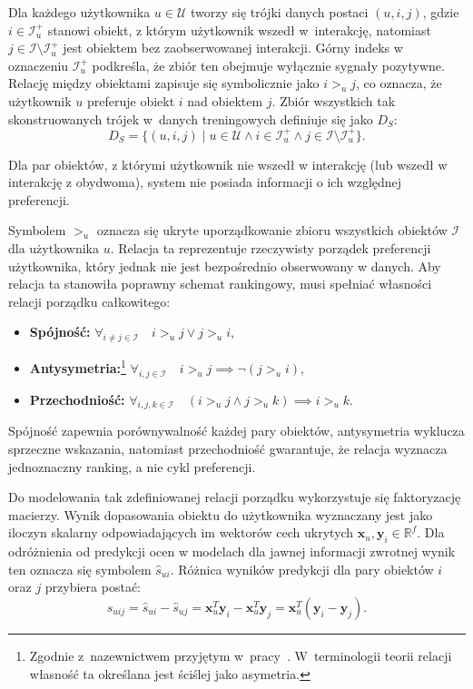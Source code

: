 Dla każdego użytkownika $u \in \mathcal{U}$ tworzy się trójki danych postaci
$(u, i, j)$, gdzie $i \in \mathcal{I}_u^+$ stanowi obiekt, z którym użytkownik
wszedł w~interakcję, natomiast $j \in \mathcal{I} \setminus \mathcal{I}_u^+$
jest obiektem bez zaobserwowanej interakcji. Górny indeks w oznaczeniu
$\mathcal{I}_u^+$ podkreśla, że zbiór ten obejmuje wyłącznie sygnały pozytywne.
Relację między obiektami zapisuje się symbolicznie jako $i >_u j$, co oznacza,
że użytkownik $u$ preferuje obiekt $i$ nad obiektem $j$. Zbiór wszystkich tak
skonstruowanych trójek w~danych treningowych definiuje się jako $D_S$:
\begin{equation}
    D_S = \{ (u, i, j) \mid u \in \mathcal{U} \land i \in \mathcal{I}_u^+
    \land j \in \mathcal{I} \setminus \mathcal{I}_u^+ \}.
\end{equation}

Dla par obiektów, z którymi użytkownik nie wszedł w interakcję (lub wszedł w interakcję z obydwoma), system nie posiada informacji o ich względnej preferencji.

Symbolem $>_u$ oznacza się ukryte uporządkowanie zbioru wszystkich obiektów $\mathcal{I}$ dla użytkownika $u$. Relacja ta reprezentuje rzeczywisty porządek preferencji użytkownika, który jednak nie jest bezpośrednio obserwowany w danych. Aby relacja ta stanowiła poprawny schemat rankingowy, musi spełniać własności relacji porządku całkowitego:
\begin{itemize}
    \item \textbf{Spójność:} $\forall_{i \neq j \in \mathcal{I}} \quad i >_u j \lor j >_u i$,
    \item \textbf{Antysymetria:}\footnote{Zgodnie z~nazewnictwem przyjętym
    w~pracy~\cite{rendle2009bpr}. W~terminologii teorii relacji własność ta
    określana jest ściślej jako asymetria.} $\forall_{i, j \in \mathcal{I}}
    \quad i >_u j \implies \neg(j >_u i)$,
    \item \textbf{Przechodniość:} $\forall_{i, j, k \in \mathcal{I}} \quad
    (i >_u j \land j >_u k) \implies i >_u k$.
\end{itemize}
Spójność zapewnia porównywalność każdej pary obiektów, antysymetria wyklucza sprzeczne wskazania, natomiast przechodniość gwarantuje, że relacja wyznacza jednoznaczny ranking, a nie cykl preferencji.

Do modelowania tak zdefiniowanej relacji porządku wykorzystuje się faktoryzację macierzy. Wynik dopasowania obiektu do użytkownika wyznaczany jest jako iloczyn skalarny odpowiadających im wektorów cech ukrytych $\mathbf{x}_u, \mathbf{y}_i \in \mathbb{R}^f$. Dla odróżnienia od predykcji ocen w modelach dla jawnej informacji zwrotnej wynik ten oznacza się symbolem $\hat{s}_{ui}$. Różnica wyników predykcji dla pary obiektów $i$ oraz $j$ przybiera postać:
\begin{equation}
    \hat{s}_{uij} = \hat{s}_{ui} - \hat{s}_{uj} = \mathbf{x}_u^T \mathbf{y}_i - \mathbf{x}_u^T \mathbf{y}_j = \mathbf{x}_u^T (\mathbf{y}_i - \mathbf{y}_j).
\end{equation}


